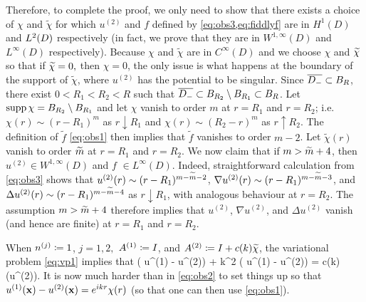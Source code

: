 Therefore, to complete the proof, we only need to show that there exists a choice of $\chi$ and $\widetilde{\chi}$ for which $u^{(2)}$ and $f$ defined by \cref{eq:obs3,eq:fiddlyf} are 
in $H^{1}(D)$ and $\LtD$ respectively (in fact, we prove that they are in $W^{1,\infty}(D)$ and $L^\infty(D)$ respectively).
Because $\chi$ and $\widetilde{\chi}$ are in $C^\infty(D)$ and we choose $\chi$ and $\widetilde{\chi}$ so that if $\widetilde{\chi}=0,$ then $\chi=0$, the only issue is what happens at the boundary of the support of $\widetilde{\chi}$, where $u^{(2)}$ has the potential to be singular.
Since $\overline{D_{-}} \subset B_{R}$, there exist $0<R_1<R_2<R$ such that $\overline{D_{-}} \subset B_{R_2}\setminus B_{R_1} \subset B_{R}$. Let $\operatorname{supp} \chi = B_{R_2}\setminus B_{R_1}$ and let $\chi$ vanish to order $m$ at $r= R_1$ and $r=R_2$; i.e.~$\chi(r) \sim (r-R_1)^m$ as $r \downarrow R_1$ and 
$\chi(r) \sim (R_2-r)^m$ as $r \uparrow R_2$. The definition of $\widetilde{f}$ \cref{eq:obs1} then implies that $\widetilde{f}$ vanishes to order $m-2$. Let $\widetilde{\chi}(r)$ vanish to order $\widetilde{m}$ at $r= R_1$ and $r=R_2$. 
We now claim that if $m >\widetilde{m}+4$, then $u^{(2)}\in W^{1,\infty}(D)$ and $f$ $\in L^\infty(D)$. Indeed,  
straightforward calculation from \cref{eq:obs3} shows that  $u^{(2)}(r) \sim (r-R_1)^{m-\widetilde{m}-2}$, $\nabla u^{(2)}(r) \sim (r-R_1)^{m-\widetilde{m}-3}$, and $\Delta u^{(2)}(r) \sim (r-R_1)^{m-\widetilde{m}-4}$ as $r \downarrow R_1$, with analogous behaviour at $r=R_2$.
The assumption 
$m >\widetilde{m}+4$ therefore implies that $u^{(2)}$, $\nabla u ^{(2)}$, and $\Delta u^{(2)}$ vanish (and hence are finite) at $r=R_1$ and $r=R_2$.
\epf

When $n^{(j)}\coloneqq1$, $j=1,2,$ ${A}^{(1)}\coloneqq I$, and ${A}^{(2)}\coloneqq I + c(k)\widetilde{\chi}$, the variational problem \cref{eq:vp1} implies that 
\beq\label{eq:obs2}
\Delta \big( u^{(1)} - u^{(2)}\big) + k^2 \big( u^{(1)} - u^{(2)}\big) = c(k)\nabla\cdot \big(\widetilde{\chi}\nabla u^{(2)}\big).
\eeq
It is now much harder than in \cref{eq:obs2} to set things up so that $ u^{(1)}(\mathbf{x}) - u^{(2)}(\mathbf{x})=e^{i kr}\chi(r)$ (so that one can then use \cref{eq:obs1}).
\ere


